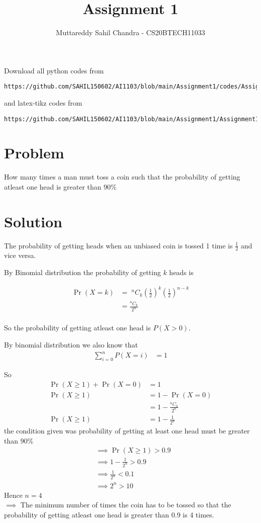 \documentclass[journal,12pt,twocolumn]{IEEEtran}
\begin{document}
\title{Assignment 1}
\author{Muttareddy Sahil Chandra - CS20BTECH11033}
\maketitle
\newpage
\bigskip
\renewcommand{\thefigure}{\theenumi}
\renewcommand{\thetable}{\theenumi}
Download all python codes from 
\begin{lstlisting}
https://github.com/SAHIL150602/AI1103/blob/main/Assignment1/codes/Assignment.py
\end{lstlisting}
%
and latex-tikz codes from 
%
\begin{lstlisting}
https://github.com/SAHIL150602/AI1103/blob/main/Assignment1/Assignment1.tex
\end{lstlisting}
\section{Problem}
How many times a man must toss a coin such that the probability of getting atleast one head is greater than $90\%$
\section{Solution} 
The probability of getting heads when an unbiased coin is tossed 1 time  is {\large$\frac{1}{2}$}  and  vice versa.
  
  By Binomial distribution the probability of getting $k$ heads is
  
      \begin{align}
        \Pr(X = k) & =\;^nC_k\left(\frac{1}{2}\right)^k\left(\frac{1}{2}\right)^{n-k}\\  
        & =\frac{^nC_k}{2^n}\\  
      \end{align}
  
     
  So the probability of getting atleast one head is $P(X>0) $.
  
  By binomial distribution we also know that
  \begin{align}
      \sum_{i=0}^{n}P(X=i) &= 1
  \end{align}
  
  So    
  \begin{align}
      \Pr(X\ge 1) + \Pr(X=0) &= 1\\
      \Pr(X\ge 1) &= 1 - \Pr(X=0)\\
      &= 1 - \frac{^nC_0}{2^n}\\
      \Pr(X\ge 1) &= 1 - \frac{1}{2^n}
  \end{align}
  the condition given was probability of getting at least one head must be greater than  $90\%$
 \begin{align}
      &\implies \Pr(X\ge 1)>0.9\\
      &\implies 1-\frac{1}{2^n}>0.9\\
      &\implies\frac{1}{2^n}<0.1\\
      &\implies 2^n>10
  \end{align}
  Hence $n =4$\\
$\implies$ The minimum number of times the coin has to be tossed so that the probability  of getting atleast one head is greater than 0.9 is 4 times.    
\end{document}
